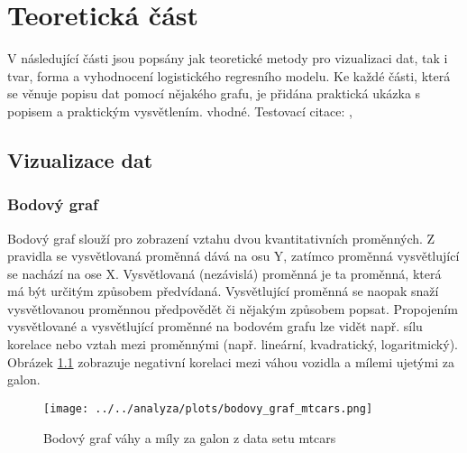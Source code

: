 \chapter{Teoretická část}
V následující části jsou popsány jak teoretické metody pro vizualizaci dat, tak i tvar, forma a vyhodnocení logistického regresního modelu. 
Ke každé části, která se věnuje popisu dat pomocí nějakého grafu, je přidána praktická ukázka s popisem a praktickým vysvětlením.
vhodné.
Testovací citace: \cite{Hebak2015}, \cite{Kleinbaum2010}

\section{Vizualizace dat}
\subsection{Bodový graf}
{\color{red}
Bodový graf slouží pro zobrazení vztahu dvou kvantitativních proměnných. Z pravidla se vysvětlovaná proměnná dává na osu Y,
zatímco proměnná vysvětlující se nachází na ose X. Vysvětlovaná (nezávislá) proměnná je ta proměnná, která má být určitým způsobem předvídaná.
Vysvětlující proměnná se naopak snaží vysvětlovanou proměnnou předpovědět či nějakým způsobem popsat. Propojením vysvětlované a vysvětlující proměnné
na bodovém grafu lze vidět např. sílu korelace nebo vztah mezi proměnnými (např. lineární, kvadratický, logaritmický). Obrázek \ref{fig:bodovy_graf_mtcars} zobrazuje
negativní korelaci mezi váhou vozidla a mílemi ujetými za galon.
}

\begin{figure}[H]
    \centering
    \texttt{[image: ../../analyza/plots/bodovy\_graf\_mtcars.png]}
    \caption{Bodový graf váhy a míly za galon z data setu mtcars} 
    \label{fig:bodovy_graf_mtcars}
\end{figure}

